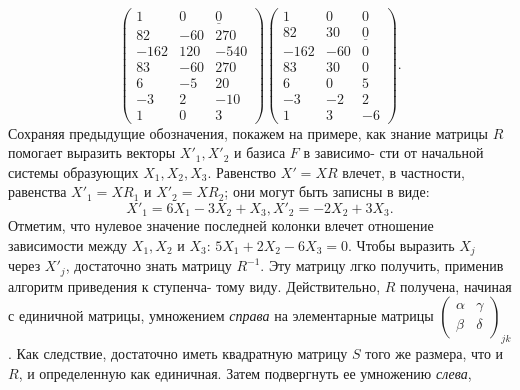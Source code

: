 \documentclass{mai_book}
\begin{document}
	$$\begin{pmatrix} 1 & 0 & \underline{0} \\ 82 & -60 & 270 \\ -162 & 120 & -540 \\ 83 & -60 & 270 \\ 6 & -5 & 20 \\ -3 & 2 & -10 \\ 1 & 0 & 3\end{pmatrix}\begin{pmatrix} 1 & 0 & 0 \\ 82 & 30 & \underline{0} \\ -162 & -60 & 0 \\ 83 & 30 & 0 \\ 6 & 0 & 5 \\ -3 & -2 & 2 \\ 1 & 3 & -6\end{pmatrix}.$$
	Сохраняя предыдущие обозначения, покажем на примере, как знание\linebreak
	матрицы $R$ помогает выразить векторы $X'_1, X'_2$ и  базиса $F$ в зависимо-\linebreak
	сти от начальной системы образующих $X_1, X_2, X_3$. Равенство $X' = XR$\linebreak
	влечет, в частности, равенства $X'_1 = XR_1$ и $X'_2 = XR_2$; они могут быть\linebreak
	записны в виде:
	$$X'_1 = 6X_1 - 3X_2 + X_3, X'_2 = -2X_2 + 3X_3.$$
	Отметим, что нулевое значение последней колонки влечет отношение\linebreak
	зависимости между $X_1, X_2$ и $X_3$:
	$5X_1 + 2X_2 - 6X_3 = 0.$
	Чтобы выразить $X_j$ через $X'_j$, достаточно знать матрицу $R^{-1}$. Эту\linebreak
	матрицу лгко получить, применив алгоритм приведения к ступенча-\linebreak
	тому виду. Действительно, $R$ получена, начиная с единичной матрицы,\linebreak
	умножением {\it справа} на элементарные матрицы {\scriptsize $\begin{pmatrix} \alpha & \gamma \\ \beta & \delta \end{pmatrix}_{jk}$}. Как следствие,\linebreak
	достаточно иметь квадратную матрицу $S$ того же размера, что и $R$, и\linebreak
	определенную как единичная. Затем подвергнуть ее умножению {\it слева},\linebreak
\end{document}
